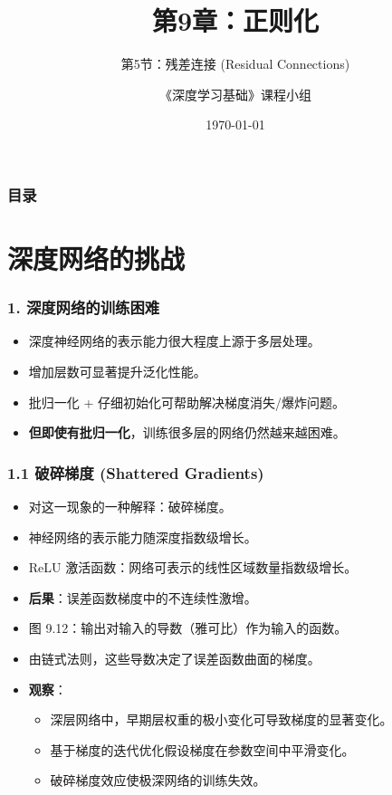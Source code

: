 \documentclass[t,aspectratio=169]{beamer} %
\title[9.5.残差连接]{第9章：正则化}
\subtitle{第5节：残差连接 (Residual Connections)}
\author{《深度学习基础》课程小组}
\date{\today}
\begin{document}
\frame{\titlepage}

\begin{frame}
    \frametitle{目录}
    \tableofcontents
\end{frame}

\section{深度网络的挑战}

\begin{frame}
    \frametitle{1. 深度网络的训练困难}
    \begin{itemize}
        \item 深度神经网络的表示能力很大程度上源于\alert{多层处理}。
        \item 增加层数可\alert{显著提升泛化性能}。
        \item 批归一化 + 仔细初始化可帮助解决\alert{梯度消失/爆炸}问题。
        \item \textbf{但即使有批归一化}，训练很多层的网络仍然越来越困难。
    \end{itemize}
\end{frame}

\begin{frame}
    \frametitle{1.1 破碎梯度 (Shattered Gradients)}
    \begin{itemize}
        \item 对这一现象的一种解释：\alert{破碎梯度}。
        \item 神经网络的表示能力随深度\alert{指数级增长}。
        \item ReLU 激活函数：网络可表示的\alert{线性区域数量指数级增长}。
        \item \textbf{后果}：误差函数梯度中的\alert{不连续性激增}。
        \item 图 9.12：输出对输入的导数（雅可比）作为输入的函数。
        \item 由链式法则，这些导数决定了误差函数曲面的梯度。
        \item \textbf{观察}：
        \begin{itemize}
            \item 深层网络中，早期层权重的\alert{极小变化}可导致梯度的\alert{显著变化}。
            \item 基于梯度的迭代优化假设梯度在参数空间中\alert{平滑变化}。
            \item 破碎梯度效应使极深网络的训练\alert{失效}。
        \end{itemize}
    \end{itemize}
\end{frame}
\end{document}
